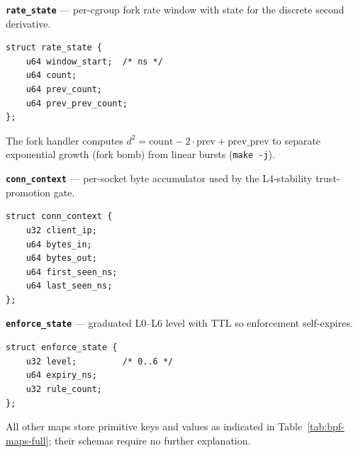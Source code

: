 \textbf{\texttt{rate\_state}} — per-cgroup fork rate window with state for
the discrete second derivative.
\begin{verbatim}
struct rate_state {
    u64 window_start;  /* ns */
    u64 count;
    u64 prev_count;
    u64 prev_prev_count;
};
\end{verbatim}
The fork handler computes $d^2 = \mathrm{count} - 2\cdot\mathrm{prev} +
\mathrm{prev\_prev}$ to separate exponential growth (fork bomb) from
linear bursts (\texttt{make -j}).

\textbf{\texttt{conn\_context}} — per-socket byte accumulator used by the
L4-stability trust-promotion gate.
\begin{verbatim}
struct conn_context {
    u32 client_ip;
    u64 bytes_in;
    u64 bytes_out;
    u64 first_seen_ns;
    u64 last_seen_ns;
};
\end{verbatim}

\textbf{\texttt{enforce\_state}} — graduated L0--L6 level with TTL so
enforcement self-expires.
\begin{verbatim}
struct enforce_state {
    u32 level;         /* 0..6 */
    u64 expiry_ns;
    u32 rule_count;
};
\end{verbatim}

All other maps store primitive keys and values as indicated in
Table~\ref{tab:bpf-maps-full}; their schemas require no further
explanation.
